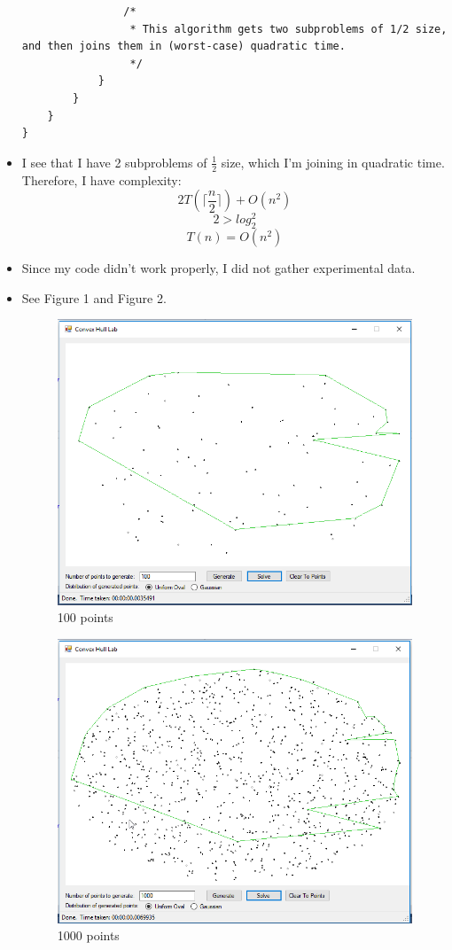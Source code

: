 \documentclass{article}
\begin{document}
\begin{itemize}
\begin{lstlisting}
                /*
                 * This algorithm gets two subproblems of 1/2 size, and then joins them in (worst-case) quadratic time.
                 */
            }
        }
    }
}
    \end{lstlisting}
    \item I see that I have 2 subproblems of $\frac{1}{2}$ size, which I'm joining in quadratic time.  Therefore,
    I have complexity: $$2T(\lceil\frac{n}{2}\rceil) + O(n^2)$$ $$2 > log_2^2$$ $$T(n) = O(n^2)$$
    \item Since my code didn't work properly, I did not gather experimental data.  
    \item See Figure 1 and Figure 2.
    \begin{figure}[p]
        \centering
        \includegraphics[resolution=72, width=\textwidth]{100}
        \caption{100 points}
    \end{figure}
        \begin{figure}[p]
        \centering
        \includegraphics[resolution=72, width=\textwidth]{1000}
        \caption{1000 points}
    \end{figure}
\end{itemize}
\end{document}

